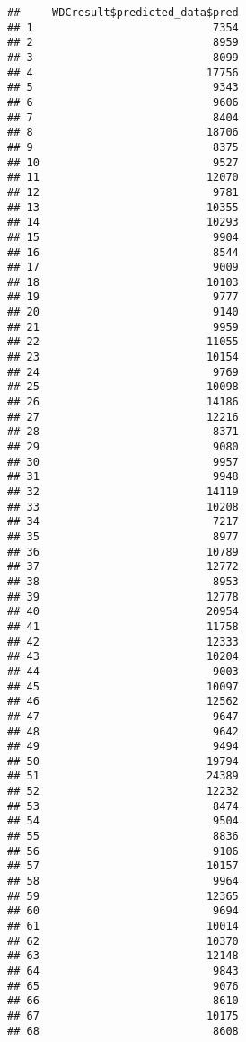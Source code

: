 \documentclass[
]{article}
\begin{document}
\begin{verbatim}
##     WDCresult$predicted_data$pred
## 1                            7354
## 2                            8959
## 3                            8099
## 4                           17756
## 5                            9343
## 6                            9606
## 7                            8404
## 8                           18706
## 9                            8375
## 10                           9527
## 11                          12070
## 12                           9781
## 13                          10355
## 14                          10293
## 15                           9904
## 16                           8544
## 17                           9009
## 18                          10103
## 19                           9777
## 20                           9140
## 21                           9959
## 22                          11055
## 23                          10154
## 24                           9769
## 25                          10098
## 26                          14186
## 27                          12216
## 28                           8371
## 29                           9080
## 30                           9957
## 31                           9948
## 32                          14119
## 33                          10208
## 34                           7217
## 35                           8977
## 36                          10789
## 37                          12772
## 38                           8953
## 39                          12778
## 40                          20954
## 41                          11758
## 42                          12333
## 43                          10204
## 44                           9003
## 45                          10097
## 46                          12562
## 47                           9647
## 48                           9642
## 49                           9494
## 50                          19794
## 51                          24389
## 52                          12232
## 53                           8474
## 54                           9504
## 55                           8836
## 56                           9106
## 57                          10157
## 58                           9964
## 59                          12365
## 60                           9694
## 61                          10014
## 62                          10370
## 63                          12148
## 64                           9843
## 65                           9076
## 66                           8610
## 67                          10175
## 68                           8608

\end{verbatim}
\end{document}
